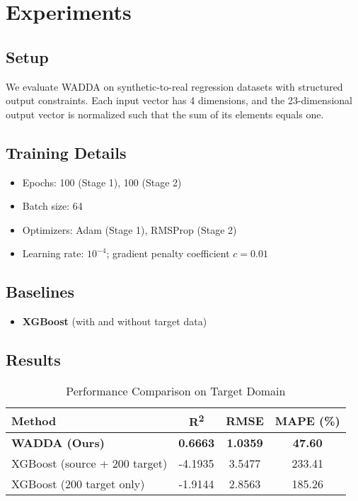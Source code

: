 \documentclass{article}
\begin{document}
\section{Experiments}

\subsection{Setup}
We evaluate WADDA on synthetic-to-real regression datasets with structured output constraints. Each input vector has 4 dimensions, and the 23-dimensional output vector is normalized such that the sum of its elements equals one.

\subsection{Training Details}
\begin{itemize}
  \item Epochs: 100 (Stage 1), 100 (Stage 2)
  \item Batch size: 64
  \item Optimizers: Adam (Stage 1), RMSProp (Stage 2)
  \item Learning rate: $10^{-4}$; gradient penalty coefficient $c = 0.01$
\end{itemize}

\subsection{Baselines}
\begin{itemize}
  \item \textbf{XGBoost} (with and without target data)
\end{itemize}

\subsection{Results}

\begin{table}[H]
\centering
\caption{Performance Comparison on Target Domain}
\begin{tabular}{|l|c|c|c|}
\hline
\textbf{Method} & \textbf{R\textsuperscript{2}} & \textbf{RMSE} & \textbf{MAPE (\%)} \\
\hline
\textbf{WADDA (Ours)} & \textbf{0.6663} & \textbf{1.0359} & \textbf{47.60} \\
XGBoost (source + 200 target) & -4.1935 & 3.5477 & 233.41 \\
XGBoost (200 target only) & -1.9144 & 2.8563 & 185.26 \\
\hline
\end{tabular}
\label{tab:performance}
\end{table}
\end{document}
